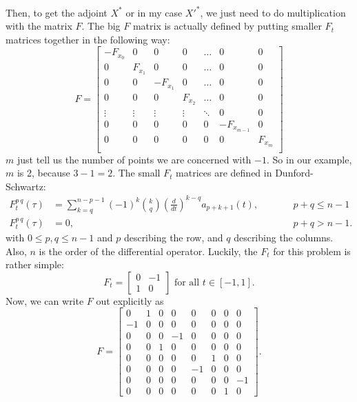 \documentclass[11pt,reqno,oneside,a4paper]{article}
\begin{document}
   Then, to get the adjoint $X^*$ or in my case $X'^*$, we just need to do multiplication with the matrix $F$.
   The big $F$ matrix is actually defined by putting smaller $F_t$ matrices together in the following way:
   $$
   F = \begin{bmatrix} 
   -F_{x_0} & 0 & 0 & 0 & \dots & 0 & 0 \\
   0 & F_{x_1} & 0 & 0 & \dots & 0 & 0 \\
   0 & 0 & -F_{x_1} & 0 & \dots & 0 & 0 \\
   0 & 0 & 0 & F_{x_2} & \dots & 0 & 0 \\
   \vdots & \vdots & \vdots & \vdots & \ddots & 0 & 0 \\
   0 & 0 & 0 & 0 & 0 & -F_{x_{m-1}} & 0 \\
   0 & 0 & 0 & 0 & 0 & 0 & F_{x_{m}} \\
   \end{bmatrix}
   $$
   $m$ just tell us the number of points we are concerned with $-1$. So in our example, $m$ is 2, because $3-1 = 2$. The small $F_t$ matrices are defined in Dunford-Schwartz: 
   \begin{align*}
   F^{p\,q}_t(\tau) &= \sum^{n-p-1}_{k = q} (-1)^k \binom{k}{q} \left( \frac{d}{dt}\right)^{k-q} a_{p+k+1}(t), &&\qquad p + q\leq n - 1\\
   F^{p\,q}_t(\tau) &= 0, &&\qquad p + q > n - 1.
   \end{align*}
   with $0 \leq p,q \leq n-1$ and $p$ describing the row, and $q$ describing the columns. Also, $n$ is the order of the differential operator. Luckily, the $F_t$ for this problem is rather simple:
   $$ F_t=\begin{bmatrix} 
   0 & -1 \\
   1 & 0 
   \end{bmatrix} \text{ for all } t\in [-1,1]. $$
   Now, we can write $F$ out explicitly as
   $$ F=\begin{bmatrix} 
   0 & 1 & 0 & 0 & 0 & 0 & 0 & 0 \\
   -1 & 0 & 0 & 0 & 0 & 0 & 0 & 0 \\
   0 & 0 & 0 & -1 & 0 & 0 & 0 & 0 \\
   0 & 0 & 1 & 0 & 0 & 0 & 0 & 0 \\
   0 & 0 & 0 & 0 & 0 & 1 & 0 & 0 \\
   0 & 0 & 0 & 0 & -1 & 0 & 0 & 0 \\
   0 & 0 & 0 & 0 & 0 & 0 & 0 & -1 \\
   0 & 0 & 0 & 0 & 0 & 0 & 1 & 0 
   \end{bmatrix}. $$
\end{document}
